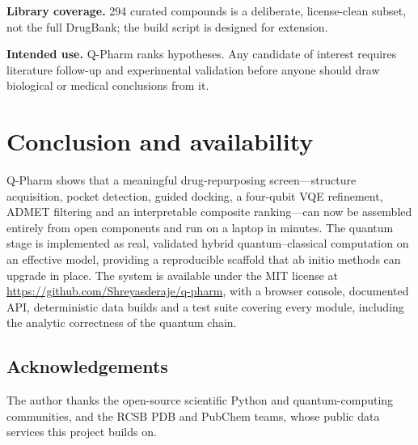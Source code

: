 \documentclass[10pt,a4paper,twocolumn]{article}
\begin{document}
\textbf{Library coverage.} 294 curated compounds is a deliberate, license-clean subset,
not the full DrugBank; the build script is designed for extension.

\textbf{Intended use.} Q-Pharm ranks hypotheses. Any candidate of interest requires
literature follow-up and experimental validation before anyone should draw biological or
medical conclusions from it.

\section{Conclusion and availability}

Q-Pharm shows that a meaningful drug-repurposing screen---structure acquisition, pocket
detection, guided docking, a four-qubit VQE refinement, ADMET filtering and an
interpretable composite ranking---can now be assembled entirely from open components and
run on a laptop in minutes. The quantum stage is implemented as real, validated
hybrid quantum--classical computation on an effective model, providing a reproducible
scaffold that ab initio methods can upgrade in place. The system is available under the
MIT license at \url{https://github.com/Shreyasderaje/q-pharm}, with a browser console,
documented API, deterministic data builds and a test suite covering every module,
including the analytic correctness of the quantum chain.

\subsection*{Acknowledgements}
The author thanks the open-source scientific Python and quantum-computing communities,
and the RCSB PDB and PubChem teams, whose public data services this project builds on.
\end{document}
